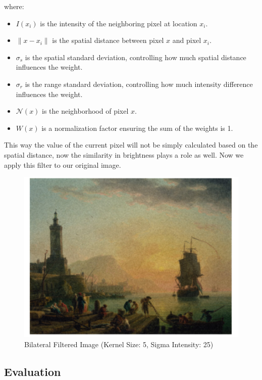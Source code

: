 \documentclass[hidelinks,12pt]{article}
\begin{document}
	where:
	\begin{itemize}
		\item \( I(x_i) \) is the intensity of the neighboring pixel at location \( x_i \).
		\item \( \|x - x_i\| \) is the spatial distance between pixel \( x \) and pixel \( x_i \).
		\item \( \sigma_s \) is the spatial standard deviation, controlling how much spatial distance influences the weight.
		\item \( \sigma_r \) is the range standard deviation, controlling how much intensity difference influences the weight.
		\item \( \mathcal{N}(x) \) is the neighborhood of pixel \( x \).
		\item \( W(x) \) is a normalization factor ensuring the sum of the weights is 1.
	\end{itemize}
	This way the value of the current pixel will not be simply calculated based on the spatial distance, now the similarity in brightness plays a role as well. Now we apply this filter to our original image.
	\vspace*{2cm}
	\begin{figure}[h!]
		\centering
		\includegraphics[scale=0.7]{figures/bilateral_filter/1.png}
		\caption{Bilateral Filtered Image (Kernel Size: 5, Sigma Intensity: 25)}
	\end{figure}
	
	\pagebreak
	
	\subsection{Evaluation}
	
\end{document}
